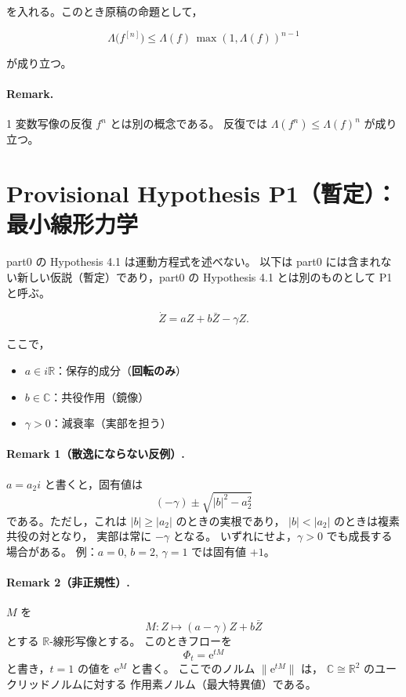 \documentclass[12pt]{article}
\begin{document}
を入れる。このとき原稿の命題として，


\[
\Lambda\bigl(f^{[n]}\bigr)
\le
\Lambda(f)\,\max(1,\Lambda(f))^{n-1}
\]


が成り立つ。

\paragraph{Remark.}
1 変数写像の反復 $f^n$ とは別の概念である。
反復では $\Lambda(f^n)\le \Lambda(f)^n$ が成り立つ。

\section*{Provisional Hypothesis P1（\textbf{暫定}）：最小線形力学}

part0 の Hypothesis 4.1 は運動方程式を述べない。
以下は part0 には含まれない新しい仮説（暫定）であり，part0 の Hypothesis 4.1 とは別のものとして P1 と呼ぶ。

\[
\dot Z = aZ + b\bar Z - \gamma Z.
\]

ここで，
\begin{itemize}
\item $a\in i\mathbb{R}$：保存的成分（\textbf{回転のみ}）
\item $b\in\mathbb{C}$：共役作用（鏡像）
\item $\gamma>0$：減衰率（実部を担う）
\end{itemize}

\paragraph{Remark 1（散逸にならない反例）.}
$a=a_2 i$ と書くと，固有値は
\[
(-\gamma)\pm\sqrt{|b|^2-a_2^2}
\]
である。ただし，これは $|b|\ge|a_2|$ のときの実根であり，
$|b|<|a_2|$ のときは複素共役の対となり，
実部は常に $-\gamma$ となる。
いずれにせよ，$\gamma>0$ でも成長する場合がある。
例：$a=0$, $b=2$, $\gamma=1$ では固有値 $+1$。

\paragraph{Remark 2（非正規性）.}
$M$ を
\[
M: Z \mapsto (a-\gamma)Z + b\bar Z
\]
とする $\mathbb{R}$-線形写像とする。
このときフローを
\[
\Phi_t = \mathrm{e}^{tM}
\]
と書き，$t=1$ の値を $\mathrm{e}^M$ と書く。
ここでのノルム $\|\mathrm{e}^{tM}\|$ は，
$\mathbb{C}\cong\mathbb{R}^2$ のユークリッドノルムに対する
作用素ノルム（最大特異値）である\cite{HJ}。
\end{document}

